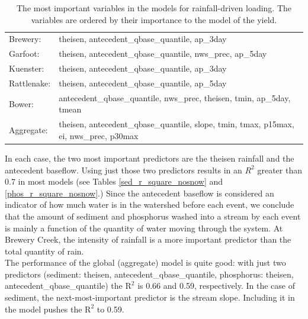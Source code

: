 \documentclass[10pt]{article}
\begin{document}
\begin{table}[h!]
\begin{center}
\begin{tabular}{ll}
        \hspace{5mm} Brewery: & theisen, antecedent\_qbase\_quantile, ap\_3day\\
        \hspace{5mm} Garfoot: & theisen, antecedent\_qbase\_quantile, nws\_prec, ap\_5day\\
        \hspace{5mm} Kuenster: & theisen, antecedent\_qbase\_quantile, ap\_3day\\
        \hspace{5mm} Rattlenake: & theisen, antecedent\_qbase\_quantile, ap\_5day\\
        \hspace{5mm} Bower: & antecedent\_qbase\_quantile, nws\_prec, theisen, tmin, ap\_5day, tmean\\
        \hspace{5mm} Aggregate: & theisen, antecedent\_qbase\_quantile, slope, tmin, tmax, p15max, ei, nws\_prec, p30max\\
    \end{tabular}
    \caption{The most important variables in the models for rainfall-driven loading. The variables are ordered by their importance to the model of the yield. \label{nosnow_predictor_list}}
    \end{center}
\end{table}

In each case, the two most important predictors are the theisen rainfall and the antecedent baseflow. Using just those two predictors results in an $R^2$ greater than 0.7 in most models (see Tables \ref{sed_r_square_nosnow} and \ref{phos_r_square_nosnow}.) Since the antecedent baseflow is considered an indicator of how much water is in the watershed before each event, we conclude that the amount of sediment and phosphorus washed into a stream by each event is mainly a function of the quantity of water moving through the system. At Brewery Creek, the intensity of rainfall is a more important predictor than the total quantity of rain.\\

The performance of the global (aggregate) model is quite good: with just two predictors (sediment: theisen, antecedent\_qbase\_quantile, phosphorus: theisen, antecedent\_qbase\_quantile) the $\text{R}^2$ is 0.66 and 0.59, respectively. In the case of sediment, the next-most-important predictor is the stream slope. Including it in the model pushes the $\text{R}^2$ to 0.59.\\
\end{document}
